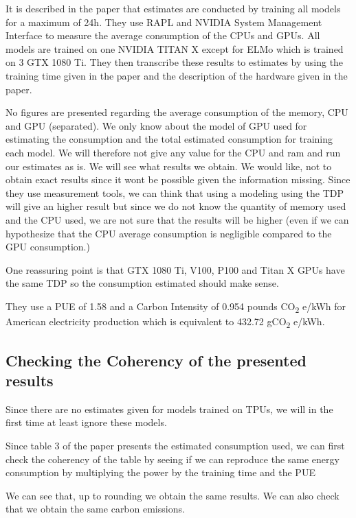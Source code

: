 \documentclass[11pt]{article}
\begin{document}
It is described in the paper that estimates are conducted by training
all models for a maximum of 24h. They use RAPL and NVIDIA System
Management Interface to measure the average consumption of the CPUs and
GPUs. 
All models are trained on one NVIDIA TITAN X except for ELMo
which is trained on 3 GTX 1080 Ti.
They then transcribe these results to estimates by using the training
time given in the paper and the description of the hardware given in
the paper.

No figures are presented regarding the average consumption of the
memory, CPU and GPU (separated). We only know about the model of GPU used for
estimating the consumption and the total estimated consumption for
training each model. We will therefore not give any value for
the CPU and ram and run our estimates as is. We will see what results
we obtain. We would like, not to obtain exact results since it wont be
possible given the information missing. Since they use measurement
tools, we can think that using a modeling using the \gls{TDP} will give
an higher result but since we do not know the quantity of memory used
and the CPU used, we are not sure that the results will be higher
(even if we can hypothesize that the CPU average consumption is
negligible compared to the GPU consumption.)

One reassuring point is that GTX 1080 Ti, V100, P100 and Titan X GPUs have the same
\gls{TDP} so the consumption estimated should make sense.

They use a \gls{PUE} of 1.58 and a Carbon Intensity of 0.954 pounds CO\textsubscript{2}
e/kWh for American electricity production which is equivalent to
432.72 gCO\textsubscript{2} e/kWh.

\subsection{Checking the Coherency of the presented results}
\label{sec:orgb559e0b}

Since there are no estimates given for models trained on TPUs, we will
in the first time at least ignore these models.

Since table 3 of the paper presents the estimated consumption used, we can first
check the coherency of the table by seeing if we can reproduce the
same energy consumption by multiplying the power by the training time
and the \gls{PUE}

We can see that, up to rounding we obtain the same results.
We can also check that we obtain the same carbon emissions.
\end{document}
